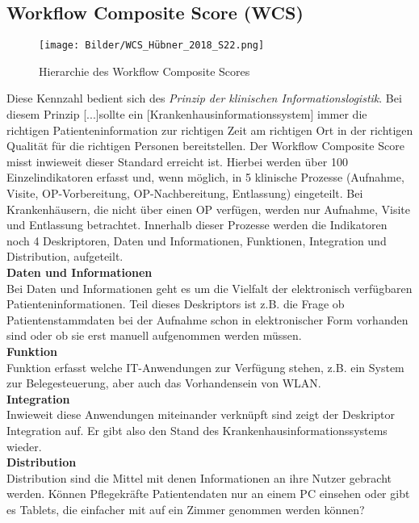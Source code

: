 \subsection{Workflow Composite Score (WCS)}
	\begin{figure}[ht]
		\centering
		\texttt{[image: Bilder/WCS\_Hübner\_2018\_S22.png]}
		\caption{Hierarchie des Workflow Composite Scores \parencite[22]{huebner2018}}
		\label{fig:WCS}
	\end{figure}
	Diese Kennzahl bedient sich des \textit{Prinzip der klinischen Informationslogistik}. Bei diesem Prinzip \glqq{}[...]sollte ein [Krankenhausinformationssystem] immer die richtigen Patienteninformation zur richtigen Zeit am richtigen Ort in der richtigen Qualität für die richtigen Personen bereitstellen.\grqq\parencite[36]{huebner2019} Der Workflow Composite Score misst inwieweit dieser Standard erreicht ist. Hierbei werden über 100 Einzelindikatoren erfasst und, wenn möglich, in 5 klinische Prozesse (Aufnahme, Visite, OP-Vorbereitung, OP-Nachbereitung, Entlassung) eingeteilt. Bei Krankenhäusern, die nicht über einen OP verfügen, werden nur Aufnahme, Visite und Entlassung betrachtet. Innerhalb dieser Prozesse werden die Indikatoren noch 4 Deskriptoren, Daten und Informationen, Funktionen, Integration und Distribution, aufgeteilt. \parencite{huebner2019}
	\vspace{\parheadvspace}\\
	\textbf{Daten und Informationen}\\
	Bei Daten und Informationen geht es um die Vielfalt der elektronisch verfügbaren Patienteninformationen. Teil dieses Deskriptors ist z.B. die Frage ob Patientenstammdaten bei der Aufnahme schon in elektronischer Form vorhanden sind oder ob sie erst manuell aufgenommen werden müssen. 
	\vspace{\parheadvspace}\\
	\textbf{Funktion}\\
	Funktion erfasst welche IT-Anwendungen zur Verfügung stehen, z.B. ein System zur Belegesteuerung, aber auch das Vorhandensein von WLAN.
	\vspace{\parheadvspace}\\
	\textbf{Integration}\\
	Inwieweit diese Anwendungen miteinander verknüpft sind zeigt der Deskriptor Integration auf. Er gibt also den Stand des Krankenhausinformationssystems wieder.
	\vspace{\parheadvspace}\\
	\textbf{Distribution}\\
	Distribution sind die Mittel mit denen Informationen an ihre Nutzer gebracht werden. Können Pflegekräfte Patientendaten nur an einem PC einsehen oder gibt es Tablets, die einfacher mit auf ein Zimmer genommen werden können?

